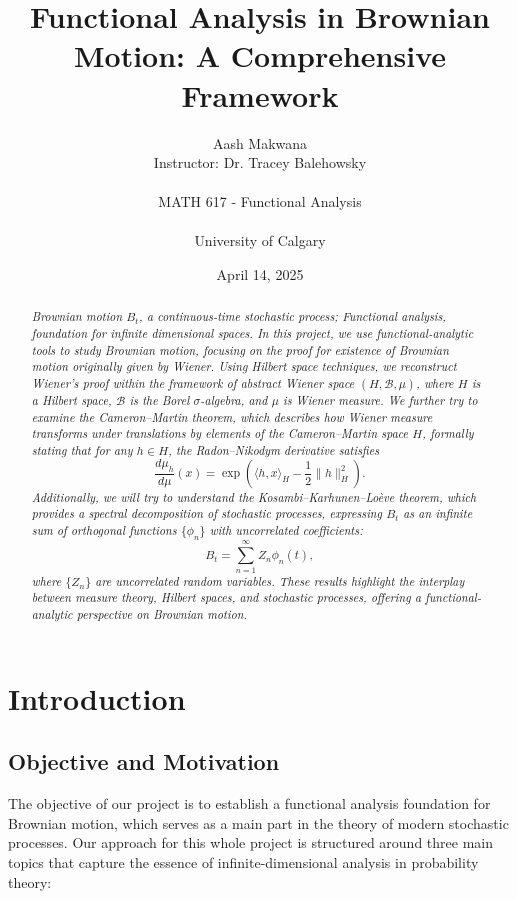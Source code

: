\documentclass[12pt]{report}
\title{Functional Analysis in Brownian Motion: A Comprehensive Framework}
\author{Aash Makwana \\ Instructor: Dr. Tracey Balehowsky \\ \\ 
MATH 617 - Functional Analysis \\ \\ University of Calgary}
\date{April 14, 2025}
\begin{document}
\maketitle

\begin{abstract}
\textit{Brownian motion $B_t$, a continuous-time stochastic process; Functional analysis, foundation for infinite dimensional spaces. In this project, we use functional-analytic tools to study Brownian motion, focusing on the proof for existence of Brownian motion\cite{bobrowski} originally given by Wiener. Using Hilbert space techniques, we reconstruct Wiener's proof within the framework of \textit{abstract Wiener space} $(H, \mathcal{B}, \mu)$, where $H$ is a Hilbert space, $\mathcal{B}$ is the Borel $\sigma$-algebra, and $\mu$ is Wiener measure. We further try to examine the \textit{Cameron–Martin theorem}\cite{karatzas}, which describes how Wiener measure transforms under translations by elements of the \textit{Cameron–Martin space} $H$, formally stating that for any $h \in H$, the Radon–Nikodym derivative satisfies  
    \[
        \frac{d\mu_h}{d\mu}(x) = \exp \left( \langle h, x \rangle_H - \frac{1}{2} \| h \|_H^2 \right).
    \]
    Additionally, we will try to understand the \textit{Kosambi–Karhunen–Lo\`eve theorem}\cite{karatzas}, which provides a spectral decomposition of stochastic processes, expressing $B_t$ as an infinite sum of orthogonal functions $\{\phi_n\}$ with uncorrelated coefficients:
    \[
        B_t = \sum_{n=1}^{\infty} Z_n \phi_n(t),
    \]
    where $\{Z_n\}$ are uncorrelated random variables. These results highlight the interplay between measure theory, Hilbert spaces, and stochastic processes, offering a functional-analytic perspective on Brownian motion.}
\end{abstract}

\tableofcontents

\chapter{Introduction}
\section{Objective and Motivation}
The objective of our project is to establish a functional analysis foundation for Brownian motion, which serves as a main part in the theory of modern stochastic processes. Our approach for this whole project is structured around three main topics that capture the essence of infinite-dimensional analysis in probability theory:
\end{document}
